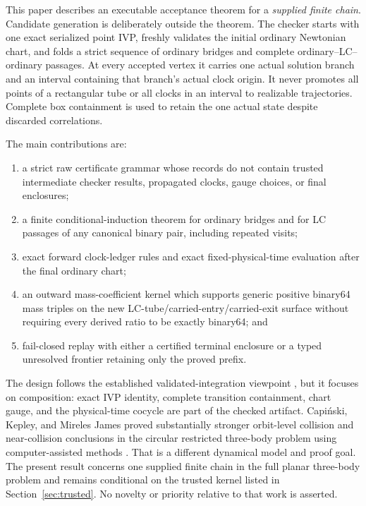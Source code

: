 \documentclass[11pt]{article}
\begin{document}
This paper describes an executable acceptance theorem for a \emph{supplied
finite chain}.  Candidate generation is deliberately outside the theorem.
The checker starts with one exact serialized point IVP, freshly validates the
initial ordinary Newtonian chart, and folds a strict sequence of ordinary
bridges and complete ordinary--LC--ordinary passages.  At every accepted
vertex it carries one actual solution branch and an interval containing that
branch's actual clock origin.  It never promotes all points of a rectangular
tube or all clocks in an interval to realizable trajectories.  Complete box
containment is used to retain the one actual state despite discarded
correlations.

The main contributions are:
\begin{enumerate}[label=(\roman*)]
\item a strict raw certificate grammar whose records do not contain trusted
      intermediate checker results, propagated clocks, gauge choices, or
      final enclosures;
\item a finite conditional-induction theorem for ordinary bridges and for LC
      passages of any canonical binary pair, including repeated visits;
\item exact forward clock-ledger rules and exact fixed-physical-time
      evaluation after the final ordinary chart;
\item an outward mass-coefficient kernel which supports generic positive
      binary64 mass triples on the new LC-tube/carried-entry/carried-exit
      surface without requiring every derived ratio to be exactly binary64;
      and
\item fail-closed replay with either a certified terminal enclosure or a typed
      unresolved frontier retaining only the proved prefix.
\end{enumerate}

The design follows the established validated-integration viewpoint
\cite{Lohner1987,NedialkovJacksonCorliss1999,MooreKearfottCloud2009}, but it
focuses on composition: exact IVP identity, complete transition containment,
chart gauge, and the physical-time cocycle are part of the checked artifact.
Capi\'nski, Kepley, and Mireles James proved substantially stronger
orbit-level collision and near-collision conclusions in the circular
restricted three-body problem using computer-assisted methods
\cite{CapinskiKepleyMirelesJames2023}.  That is a different dynamical model
and proof goal.  The present result concerns one supplied finite chain in the
full planar three-body problem and remains conditional on the trusted kernel
listed in Section~\ref{sec:trusted}.  No novelty or priority relative to that
work is asserted.
\end{document}

